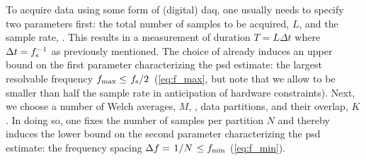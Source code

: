 To acquire data using some form of (digital) \gls{daq}, one usually needs to specify two parameters first: the total number of samples to be acquired, $L$, and the sample rate, \fs.
This results in a measurement of duration $T = L\Delta t$ where $\Delta t = f_{\mathrm{s}}^{-1}$ as previously mentioned.
The choice of \fs already induces an upper bound on the first parameter characterizing the \gls{psd} estimate: the largest resolvable frequency $\fmax\leq\flatfrac{\fs}{2}$ (\cf \cref{eq:f_max}, but note that we allow \fmax to be smaller than half the sample rate in anticipation of hardware constraints).
Next, we choose a number of Welch averages, $M$, \ie, data partitions, and their overlap, $K$.
In doing so, one fixes the number of samples per partition $N$ and thereby induces the lower bound on the second parameter characterizing the \gls{psd} estimate: the frequency spacing $\df = \flatfrac{1}{N} \leq \fmin$ (\cf \cref{eq:f_min}).
